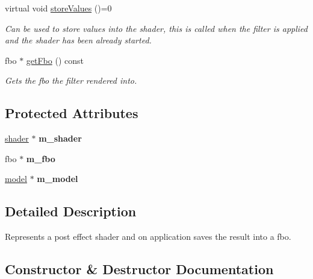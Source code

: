 \begin{DoxyCompactItemize}
virtual void \hyperlink{classflounder_1_1ipostfilter_a9b658b4672718d5ac36539875bde722e}{store\+Values} ()=0
\begin{DoxyCompactList}\small\item\em Can be used to store values into the shader, this is called when the filter is applied and the shader has been already started. \end{DoxyCompactList}\item 
fbo $\ast$ \hyperlink{classflounder_1_1ipostfilter_ae074e279e1e3c6ddea5df8530802b08b}{get\+Fbo} () const
\begin{DoxyCompactList}\small\item\em Gets the fbo the filter rendered into. \end{DoxyCompactList}\end{DoxyCompactItemize}
\subsection*{Protected Attributes}
\begin{DoxyCompactItemize}
\item 
\mbox{\label{classflounder_1_1ipostfilter_ab197a81f28df26a38b3302914d6f42fc}} 
\hyperlink{classflounder_1_1shader}{shader} $\ast$ {\bfseries m\+\_\+shader}
\item 
\mbox{\label{classflounder_1_1ipostfilter_a654b609c29c61f0232126d47de77b00a}} 
fbo $\ast$ {\bfseries m\+\_\+fbo}
\item 
\mbox{\label{classflounder_1_1ipostfilter_abf1adae588040bf18dd205f9296f92db}} 
\hyperlink{classflounder_1_1model}{model} $\ast$ {\bfseries m\+\_\+model}
\end{DoxyCompactItemize}


\subsection{Detailed Description}
Represents a post effect shader and on application saves the result into a fbo. 



\subsection{Constructor \& Destructor Documentation}
\mbox{\label{classflounder_1_1ipostfilter_adb158fccda942f9d05ec2c21ea3f8654}} 
